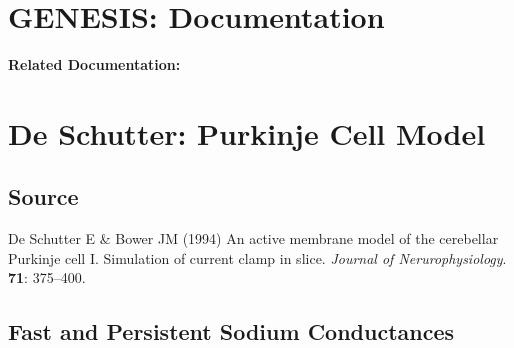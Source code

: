 \documentclass[12pt]{article}
\begin{document}
\section*{GENESIS: Documentation}

{\bf Related Documentation:}

\section*{De Schutter: Purkinje Cell Model}

\subsection*{Source}

De Schutter E \& Bower JM (1994) An active membrane model of the cerebellar Purkinje cell I. Simulation of current clamp in slice. {\it Journal of Nerurophysiology}. {\bf 71}: 375--400. \\

\subsection*{Fast and Persistent Sodium Conductances}
\end{document}
